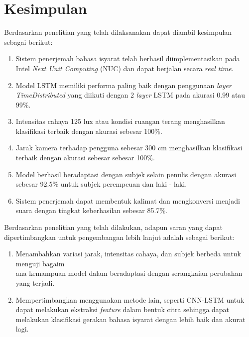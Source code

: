 \section{Kesimpulan}
\label{sec:kesimpulan}


Berdasarkan penelitian yang telah dilaksanakan dapat diambil kesimpulan sebagai berikut:

\begin{enumerate}[nolistsep]
    \item Sistem penerjemah bahasa isyarat telah berhasil diimplementasikan pada Intel \emph{Next Unit Computing} (NUC) dan dapat berjalan secara \emph{real time}. 
    \item Model LSTM memiliki performa paling baik dengan penggunaan \emph{layer TimeDistributed} yang diikuti dengan 2 \emph{layer} LSTM pada akurasi 0.99 atau 99\%.
    \item Intensitas cahaya 125 lux atau kondisi ruangan terang menghasilkan klasifikasi terbaik dengan akurasi sebesar 100\%.
    \item Jarak kamera terhadap pengguna sebesar 300 cm menghasilkan klasifikasi terbaik dengan akurasi sebesar sebesar 100\%.
    \item Model berhasil beradaptasi dengan subjek selain penulis dengan akurasi sebesar 92.5\% untuk subjek perempeuan dan laki - laki.
    \item Sistem penerjemah dapat membentuk kalimat dan mengkonversi menjadi suara dengan tingkat keberhasilan sebesar 85.7\%.
  
\end{enumerate}

Berdasarkan penelitian yang telah dilakukan, adapun saran yang dapat dipertimbangkan untuk pengembangan lebih lanjut adalah sebagai berikut:

\begin{enumerate}[nolistsep]

  \item Menambahkan variasi jarak, intensitas cahaya, dan subjek berbeda untuk menguji bagaim\\ana kemampuan model dalam beradaptasi dengan serangkaian perubahan yang terjadi.
  \item Mempertimbangkan menggunakan metode lain, seperti CNN-LSTM untuk dapat melakukan ekstraksi \emph{feature} dalam bentuk citra sehingga dapat melakukan klasifikasi gerakan bahasa isyarat dengan lebih baik dan akurat lagi.

\end{enumerate}